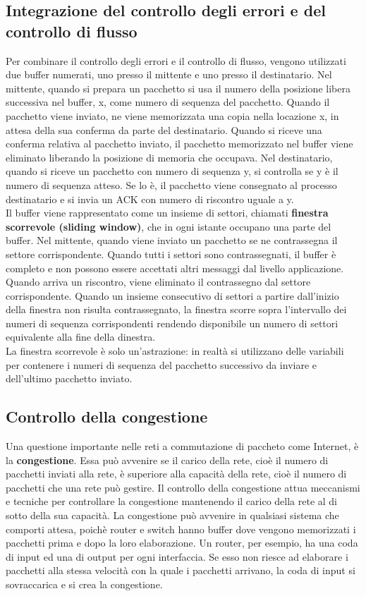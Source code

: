 \documentclass[12pt]{report}
\begin{document}
	\subsection{Integrazione del controllo degli errori e del controllo di flusso}
	Per combinare il controllo degli errori e il controllo di flusso, vengono utilizzati due buffer numerati, uno presso il mittente e uno presso il destinatario. Nel mittente, quando si prepara un pacchetto si usa il numero della posizione libera successiva nel buffer, x, come numero di sequenza del pacchetto. Quando il pacchetto viene inviato, ne viene memorizzata una copia nella locazione x, in attesa della sua conferma da parte del destinatario. Quando si riceve una conferma relativa al pacchetto inviato, il pacchetto memorizzato nel buffer viene eliminato liberando la posizione di memoria che occupava. Nel destinatario, quando si riceve un pacchetto con numero di sequenza y, si controlla se y è il numero di sequenza atteso. Se lo è, il pacchetto viene consegnato al processo destinatario e si invia un ACK con numero di riscontro uguale a y. 
	\vspace{\baselineskip}\\
	Il buffer viene rappresentato come un insieme di settori, chiamati \textbf{finestra scorrevole (sliding window)}, che in ogni istante occupano una parte del buffer. Nel mittente, quando viene inviato un pacchetto se ne contrassegna il settore corrispondente. Quando tutti i settori sono contrassegnati, il buffer è completo e non possono essere accettati altri messaggi dal livello applicazione. Quando arriva un riscontro, viene eliminato il contrassegno dal settore corrispondente. Quando un insieme consecutivo di settori a partire dall'inizio della finestra non risulta contrassegnato, la finestra scorre sopra l'intervallo dei numeri di sequenza corrispondenti rendendo disponibile un numero di settori equivalente alla fine della dinestra.
	\vspace{\baselineskip}\\
	La finestra scorrevole è solo un'astrazione: in realtà si utilizzano delle variabili per contenere i numeri di sequenza del pacchetto successivo da inviare e dell'ultimo pacchetto inviato.

	\subsection{Controllo della congestione}
	Una questione importante nelle reti a commutazione di paccheto come Internet, è la \textbf{congestione}. Essa può avvenire se il carico della rete, cioè il numero di pacchetti inviati alla rete, è superiore alla capacità della rete, cioè il numero di pacchetti che una rete può gestire. Il controllo della congestione attua meccanismi e tecniche per controllare la congestione mantenendo il carico della rete al di sotto della sua capacità. La congestione può avvenire in qualsiasi sistema che comporti attesa, poichè router e switch hanno buffer dove vengono memorizzati i pacchetti prima e dopo la loro elaborazione. Un router, per esempio, ha una coda di input ed una di output per ogni interfaccia. Se esso non riesce ad elaborare i pacchetti alla stessa velocità con la quale i pacchetti arrivano, la coda di input si sovraccarica e si crea la congestione.
\end{document}
